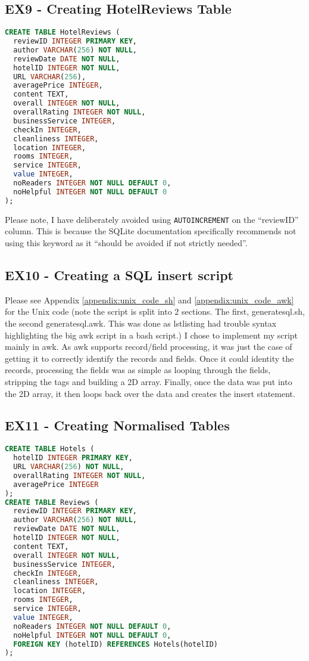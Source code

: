 \documentclass[a4paper]{article}
\begin{document}
\subsection{EX9 - Creating HotelReviews Table}
\begin{lstlisting}[language=SQL, style=default]
CREATE TABLE HotelReviews (
  reviewID INTEGER PRIMARY KEY,
  author VARCHAR(256) NOT NULL,
  reviewDate DATE NOT NULL,
  hotelID INTEGER NOT NULL,
  URL VARCHAR(256),
  averagePrice INTEGER,
  content TEXT,
  overall INTEGER NOT NULL,
  overallRating INTEGER NOT NULL,
  businessService INTEGER,
  checkIn INTEGER,
  cleanliness INTEGER,
  location INTEGER,
  rooms INTEGER,
  service INTEGER,
  value INTEGER,
  noReaders INTEGER NOT NULL DEFAULT 0,
  noHelpful INTEGER NOT NULL DEFAULT 0
);
\end{lstlisting}
Please note, I have deliberately avoided using \texttt{AUTOINCREMENT} on the ``reviewID'' column.
This is because the SQLite documentation specifically recommends not using this keyword as it ``should be avoided if not strictly needed''.

%
%
\subsection{EX10 - Creating a SQL insert script}
Please see Appendix \ref{appendix:unix_code_sh} and \ref{appendix:unix_code_awk} for the Unix code (note the script is split into 2 sections.
The first, generatesql.sh, the second generatesql.awk.
This was done as lstlisting had trouble syntax highlighting the big awk script in a bash script.)
I chose to implement my script mainly in awk.
As awk supports record/field processing, it was just the case of getting it to correctly identify the records and fields.
Once it could identity the records, processing the fields was as simple as looping through the fields, stripping the tags and building a 2D array.
Finally, once the data was put into the 2D array, it then loops back over the data and creates the insert statement.

%
%
\subsection{EX11 - Creating Normalised Tables}
\begin{lstlisting}[language=SQL, style=default]
CREATE TABLE Hotels (
  hotelID INTEGER PRIMARY KEY,
  URL VARCHAR(256) NOT NULL,
  overallRating INTEGER NOT NULL,
  averagePrice INTEGER
);
CREATE TABLE Reviews (
  reviewID INTEGER PRIMARY KEY,
  author VARCHAR(256) NOT NULL,
  reviewDate DATE NOT NULL,
  hotelID INTEGER NOT NULL,
  content TEXT,
  overall INTEGER NOT NULL,
  businessService INTEGER,
  checkIn INTEGER,
  cleanliness INTEGER,
  location INTEGER,
  rooms INTEGER,
  service INTEGER,
  value INTEGER,
  noReaders INTEGER NOT NULL DEFAULT 0,
  noHelpful INTEGER NOT NULL DEFAULT 0,
  FOREIGN KEY (hotelID) REFERENCES Hotels(hotelID)
);
\end{lstlisting}
\end{document}
